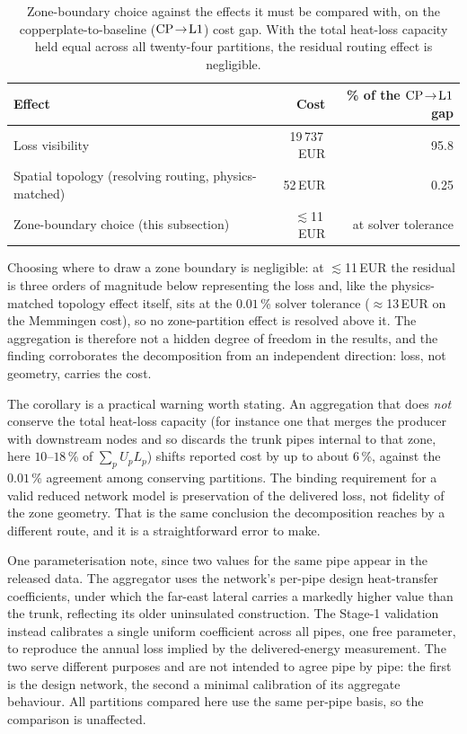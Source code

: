 \begin{table}[htbp]
\centering
\footnotesize
\caption{Zone-boundary choice against the effects it must be compared with, on the
copperplate-to-baseline ($\mathrm{CP}\!\to\!\mathrm{L1}$) cost gap. With the total heat-loss capacity held
equal across all twenty-four partitions, the residual routing effect is negligible.}
\label{tab:r16}
\begin{tabular}{lrr}
\hline
Effect & Cost & \% of the $\mathrm{CP}\!\to\!\mathrm{L1}$ gap \\
\hline
Loss visibility & 19\,737\,EUR & 95.8 \\
Spatial topology (resolving routing, physics-matched) & 52\,EUR & 0.25 \\
Zone-boundary choice (this subsection) & $\lesssim$11\,EUR & at solver tolerance \\
\hline
\end{tabular}
\end{table}

Choosing where to draw a zone boundary is negligible: at $\lesssim$11\,EUR the residual is
three orders of magnitude below representing the loss and, like the physics-matched topology
effect itself, sits at the $0.01$\,\% solver tolerance
($\approx$13\,EUR on the Memmingen cost), so no zone-partition effect is resolved
above it. The aggregation is therefore not a hidden degree
of freedom in the results, and the finding corroborates the decomposition from an
independent direction: loss, not geometry, carries the cost.

The corollary is a practical warning worth stating. An aggregation that does \emph{not}
conserve the total heat-loss capacity (for instance one that merges the producer with
downstream nodes and so discards the trunk pipes internal to that zone, here $10$--$18$\,\%
of $\sum_p U_p L_p$) shifts reported cost by up to about $6$\,\%, against the $0.01$\,\%
agreement among conserving partitions. The binding requirement for a valid reduced network
model is preservation of the delivered loss, not fidelity of the zone geometry. That is the
same conclusion the decomposition reaches by a different route, and it is a straightforward
error to make.

One parameterisation note, since two values for the same pipe appear in the released data.
The aggregator uses the network's per-pipe design heat-transfer coefficients, under which
the far-east lateral carries a markedly higher value than the trunk, reflecting its older
uninsulated construction. The Stage-1 validation instead calibrates a single uniform
coefficient across all pipes, one free parameter, to reproduce the annual loss implied by the delivered-energy measurement.
The two serve different purposes and are not intended to agree pipe by pipe: the first is
the design network, the second a minimal calibration of its aggregate behaviour. All
partitions compared here use the same per-pipe basis, so the comparison is unaffected.
